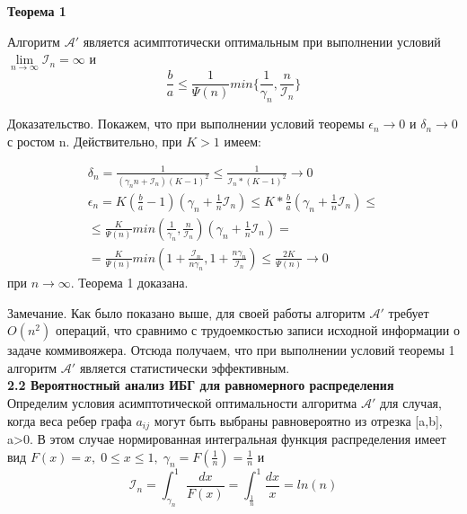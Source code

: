 \documentclass[a4paper, 14pt]{extarticle}
\begin{document}
\textbf{Теорема 1}

Алгоритм $\mathcal{A'}$ является асимптотически оптимальным при выполнении условий $\lim\limits_{{n} \to \infty} \mathcal{I}_n = \infty $ и 
\begin{equation}
\frac{b}{a} \leq \frac{1}{\Psi(n)} min \{ \frac{1}{\gamma_n}, \frac{n}{\mathcal{I}_n} \}
\end{equation}

Доказательство. Покажем, что при выполнении условий теоремы $\epsilon_n \to 0$ и $\delta_n \to 0$ с ростом n. Действительно, при $K>1$ имеем:

\begin{equation}
\begin{aligned}
\delta_n = \frac{1}{(\gamma_n n+\mathcal{I}_n)(K-1)^2} \leq \frac{1}{\mathcal{I}_n * (K-1)^2} \to 0 \\
\epsilon_n = K(\frac{b}{a}-1)(\gamma_n+\frac{1}{n} \mathcal{I}_n) \leq K*\frac{b}{a} (\gamma_n+\frac{1}{n} \mathcal{I}_n)\leq \\
\leq \frac{K}{\Psi(n)} min(\frac{1}{\gamma_n}, \frac{n}{\mathcal{I}_n})(\gamma_n+\frac{1}{n} \mathcal{I}_n) = \\
= \frac{K}{\Psi(n)} min (1+\frac{\mathcal{I}_n}{n \gamma_n}, 1+\frac{n \gamma_n}{\mathcal{I}_n}) \leq \frac{2K}{\Psi(n)} \to 0
\end{aligned}
\end{equation}
при $n \to \infty$. Теорема 1 доказана.

Замечание. Как было показано выше, для своей работы алгоритм $\mathcal{A'}$ требует $O(n^2)$ операций, что сравнимо с трудоемкостью записи исходной информации о задаче коммивояжера. Отсюда получаем, что при выполнении условий теоремы 1 алгоритм $\mathcal{A'}$ является статистически эффективным.\\

\textbf{2.2 Вероятностный анализ ИБГ для равномерного распределения}\\

Определим условия асимптотической оптимальности алгоритма $\mathcal{A'}$ для случая, когда веса ребер графа $a_{ij}$ могут быть выбраны равновероятно из отрезка [a,b], a>0. В этом случае нормированная интегральная функция распределения имеет вид $F(x) = x,\; 0 \leq x \leq 1,\; \gamma_n = F(\frac{1}{n}) = \frac{1}{n}$ и
\begin{equation}
\mathcal{I}_n = \int_{\gamma_n}^1 \frac{dx}{F(x)} = \int_{\frac{1}{n}}^1 \frac{dx}{x} = ln(n)
\end{equation}
\end{document}
